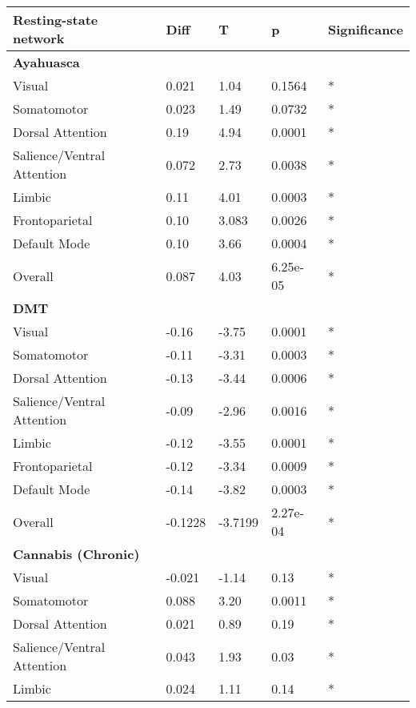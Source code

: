 \begin{table}[!ht]
    \centering
    \begin{tabular}{|l|l|l|l|l|}
    \hline
        \textbf{Resting-state network}& \textbf{Diff}& \textbf{T}& \textbf{p}& \textbf{Significance}\\ \hline
        \textbf{Ayahuasca}& ~ & ~ & ~ & ~ \\ \hline
        Visual & 0.021 & 1.04 & 0.1564 & *\\ \hline
        Somatomotor & 0.023 & 1.49 & 0.0732 & *\\ \hline
        Dorsal Attention & 0.19 & 4.94 & 0.0001 & *\\ \hline
        Salience/Ventral Attention & 0.072 & 2.73 & 0.0038 & *\\ \hline
        Limbic & 0.11 & 4.01 & 0.0003 & *\\ \hline
        Frontoparietal & 0.10 & 3.083 & 0.0026 & *\\ \hline
        Default Mode & 0.10 & 3.66 & 0.0004 & *\\ \hline
        Overall & 0.087 & 4.03 & 6.25e-05 & *\\ \hline
        \textbf{DMT}& ~ & ~ & ~ & ~ \\ \hline
        Visual & -0.16 & -3.75 & 0.0001 & * \\ \hline
        Somatomotor & -0.11 & -3.31 & 0.0003 & * \\ \hline
        Dorsal Attention & -0.13 & -3.44 & 0.0006 & * \\ \hline
        Salience/Ventral Attention & -0.09 & -2.96 & 0.0016 & * \\ \hline
        Limbic & -0.12 & -3.55 & 0.0001 & * \\ \hline
        Frontoparietal & -0.12 & -3.34 & 0.0009 & * \\ \hline
        Default Mode & -0.14 & -3.82 & 0.0003 & * \\ \hline
        Overall & -0.1228 & -3.7199 & 2.27e-04 & * \\ \hline
        \textbf{Cannabis (Chronic)}& ~ & ~ & ~ & ~ \\ \hline
        Visual & -0.021 & -1.14 & 0.13 & * \\ \hline
        Somatomotor & 0.088 & 3.20 & 0.0011 & * \\ \hline
        Dorsal Attention & 0.021 & 0.89 & 0.19 & * \\ \hline
        Salience/Ventral Attention & 0.043 & 1.93 & 0.03 & * \\ \hline
        Limbic & 0.024 & 1.11 & 0.14 & * \\ \hline

\end{tabular}
\end{table}
